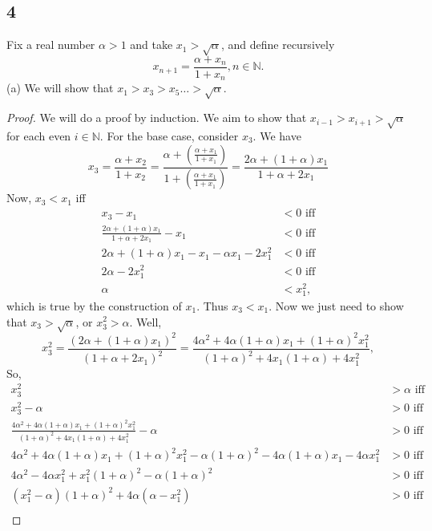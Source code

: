\documentclass[11pt]{amsart}
\begin{document}
\subsection*{4} Fix a real number $\alpha > 1$ and take $x_{1} > \sqrt{\alpha}$, and define recursively
\[ x_{n+1} = \frac{\alpha + x_{n}}{1 + x_{n}} , n\in \mathbb{N}. \]
(a) We will show that $x_{1} > x_{3} > x_{5} \hdots > \sqrt{\alpha}$.
\begin{proof}
  We will do a proof by induction. We aim to show that $x_{i-1} > x_{i+1} > \sqrt{\alpha}$ for each even $i\in \mathbb{N}$. For the base case, consider $x_{3}$. We have
  \[ x_{3} = \frac{\alpha + x_{2}}{1 + x_{2}} = \frac{\alpha + \left(\frac{\alpha + x_{1}}{1 + x_{1}}\right)}{1 + \left(\frac{\alpha + x_{1}}{1 + x_{1}}\right)} = \frac{2\alpha + (1+\alpha)x_{1}}{1 + \alpha + 2x_{1}} \]
  Now, $x_{3} < x_{1}$ iff 
  \begin{align*}
    x_{3} - x_{1} & < 0 \text{ iff} \\
    \frac{2\alpha + (1+\alpha)x_{1}}{1 + \alpha + 2x_{1}} - x_{1} & < 0 \text{ iff} \\
    2\alpha + (1+\alpha)x_{1} - x_{1} - \alpha x_{1} - 2x_{1}^{2} & < 0 \text{ iff} \\
    2\alpha - 2x_{1}^{2} & < 0 \text{ iff} \\
    \alpha & < x_{1}^{2},
  \end{align*}
  which is true by the construction of $x_{1}$. Thus $x_{3} < x_{1}$. Now we just need to show that $x_{3} > \sqrt{\alpha}$, or $x_{3}^{2} > \alpha$. Well,
  \[ x_{3}^{2} = \frac{(2\alpha + (1+\alpha)x_{1})^{2}}{(1 + \alpha + 2x_{1})^{2}} = \frac{4\alpha^{2} + 4\alpha(1+\alpha)x_{1} + (1+\alpha)^{2}x_{1}^{2}}{(1+\alpha)^{2} + 4x_{1}(1+\alpha) + 4x_{1}^{2}}, \]
  So,
  \begin{align*}
    x_{3}^{2} & > \alpha \text{ iff} \\
    x_{3}^{2} - \alpha & > 0 \text{ iff} \\
    \frac{4\alpha^{2} + 4\alpha(1+\alpha)x_{1} + (1+\alpha)^{2}x_{1}^{2}}{(1+\alpha)^{2} + 4x_{1}(1+\alpha) + 4x_{1}^{2}} - \alpha & > 0 \text{ iff} \\
    4\alpha^{2} + 4\alpha(1+\alpha)x_{1} + (1+\alpha)^{2}x_{1}^{2} - \alpha(1+\alpha)^{2} - 4\alpha(1+\alpha)x_{1} - 4\alpha x_{1}^{2} & > 0\text{ iff} \\
    4\alpha^{2} - 4\alpha x_{1}^{2} + x_{1}^{2}(1+\alpha)^{2} - \alpha(1+\alpha)^{2} & > 0 \text{ iff} \\
    (x_{1}^{2} - \alpha)(1+\alpha)^{2} + 4\alpha(\alpha - x_{1}^{2}) & > 0 \text{ iff} \\

\end{align*}
\end{proof}
\end{document}
